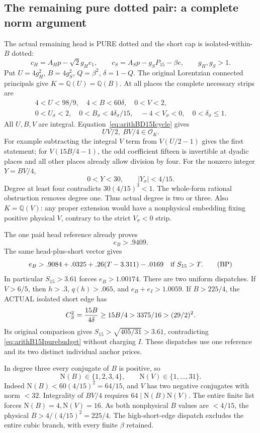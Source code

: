 \documentclass[11pt]{article}
\begin{document}
\subsection{The remaining pure dotted pair: a complete norm argument}
\label{app:arithB15Ipurepair}

The actual remaining head is PURE dotted and the short
cap is isolated-within-\(B\) dotted:
\[
 c_H=A_Hp-\sqrt2g_He_1,\qquad
 c_S=A_Sp-g_SP_{15}-\beta e,\qquad g_H,g_S>1 .
\]
Put \(U=4g_H^2\), \(B=4g_S^2\), \(Q=\beta^2\),
\(\delta=1-Q\).
The original Lorentzian connected principals give
\(K=\mathbb Q(U)=\mathbb Q(B)\).
At all places the complete necessary strips are
\[
 \begin{gathered}
 4<U<98/9,\quad 4<B<60\delta,\quad 0<V<2,\\
 0<U_\sigma<2,\quad
 0<B_\sigma<4\delta_\sigma/15,\quad
 -4<V_\sigma<0,\quad 0<\delta_\sigma\le1 .
 \end{gathered}
\]
All \(U,B,V\) are integral.
Equation~\eqref{eq:arithBD15Icycle} gives
\[
                       UV/2,\ BV/4\in\mathcal O_K.
\]
For example subtracting the integral \(V\) term
from \(V(U/2-1)\) gives the first statement;
for \(V(15B/4-1)\), the odd coefficient fifteen
is invertible at dyadic places and all other
places already allow division by four.
For the nonzero integer \(Y=BV/4\),
\[
             0<Y<30,\qquad |Y_\sigma|<4/15 .
\]
Degree at least four contradicts
\(30(4/15)^3<1\).
The whole-form rational obstruction removes degree one.
Thus actual degree is two or three.
Also \(K=\mathbb Q(V)\): any proper extension would have
a nonphysical embedding fixing positive physical \(V\),
contrary to the strict \(V_\sigma<0\) strip.

The one paid head reference already proves
\[
                         e_B>.9409 .
\]
The same head-plus-short vector gives
\[
                 e_B>.9084+.0325+.26(T-3.311)-.0169
              \quad\hbox{if }S_{15}>T .
\tag{BP}\label{eq:arithB15Ipurebudget}
\]
In particular \(S_{15}>3.61\) forces \(e_B>1.00174\).
There are two uniform dispatches.
If \(V>6/5\), then \(h>.3\), \(q(h)>.065\),
and \(e_B+e_I>1.0059\).
If \(B>225/4\), the ACTUAL isolated short edge has
\[
 C_S^2={15B\over4\delta}\ge15B/4>3375/16>(29/2)^2 .
\]
Its original comparison gives
\(S_{15}>\sqrt{405/31}>3.61\), contradicting
\eqref{eq:arithB15Ipurebudget} without charging \(I\).
These dispatches use one reference and its two distinct
individual anchor prices.

In degree three every conjugate of \(B\) is positive, so
\[
        \mathrm N(B)\in\{1,2,3,4\},\qquad
        \mathrm N(V)\in\{1,\ldots,31\}.
\]
Indeed \(\mathrm N(B)<60(4/15)^2=64/15\),
and \(V\) has two negative conjugates with norm \(<32\).
Integrality of \(BV/4\) requires
\(64\mid\mathrm N(B)\mathrm N(V)\).
The entire finite list forces
\(\mathrm N(B)=4,\mathrm N(V)=16\).
As both nonphysical \(B\) values are \(<4/15\),
the physical \(B>4/(4/15)^2=225/4\).
The high-short-edge dispatch excludes the entire
cubic branch, with every finite \(\beta\) retained.
\end{document}
